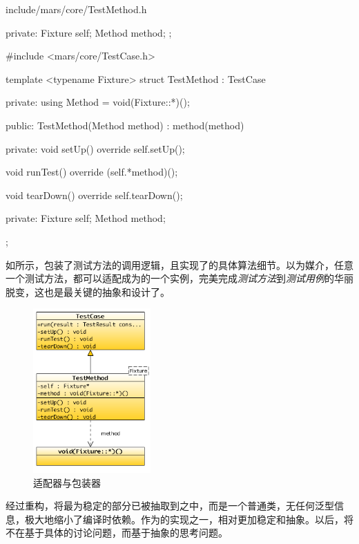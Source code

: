 \begin{content}
\begin{diff}{include/mars/core/TestMethod.h}
\begin{minicpp}
{private:
  Fixture self;
  Method method;
};
  \end{minicpp}
\tcblower
 \begin{minicpp}
#include <mars/core/TestCase.h>

template <typename Fixture>
struct TestMethod : TestCase {
private:
  using Method = void(Fixture::*)();

public:
  TestMethod(Method method)
    : method(method) {}

private:
  void setUp() override {
    self.setUp();
  }

  void runTest() override {
    (self.*method)();
  }

  void tearDown() override {
    self.tearDown();
  }

private:
  Fixture self;
  Method method;
};
  \end{minicpp}
\end{diff}

如所示，包装了测试方法的调用逻辑，且实现了的具体算法细节。以为媒介，任意一个测试方法，都可以适配成为的一个实例，完美完成\emph{测试方法}到\emph{测试用例}的华丽脱变，这也是最关键的抽象和设计了。

\begin{figure}[H]
\centering
\includegraphics[width=0.4\textwidth]{figures/xunit/testcase-adapter.png}
\caption{适配器与包装器}
 \label{fig:testcase-adapter}
\end{figure}

经过重构，将最为稳定的部分已被抽取到之中，而是一个普通类，无任何泛型信息，极大地缩小了编译时依赖。作为的实现之一，相对更加稳定和抽象。以后，将不在基于具体的讨论问题，而基于抽象的思考问题。

\end{content}

